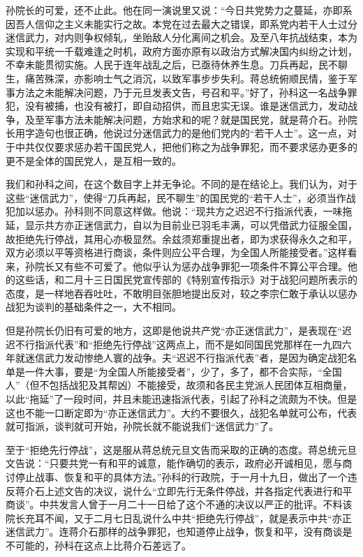 孙院长的可爱，还不止此。他在同一演说里又说：“今日共党势力之蔓延，亦即系因吾人信仰之主义未能实行之故。本党在过去最大之错误，即系党内若干人士过分迷信武力，对内则争权倾轧，坐贻敌人分化离间之机会。及至八年抗战结束，本为实现和平统一千载难逢之时机，政府方面亦原有以政治方式解决国内纠纷之计划，不幸未能贯彻实施。人民于连年战乱之后，已亟待休养生息。刀兵再起，民不聊生，痛苦殊深，亦影响士气之消沉，以致军事步步失利。蒋总统俯顺民情，鉴于军事方法之未能解决问题，乃于元旦发表文告，号召和平。”好了，孙科这一名战争罪犯，没有被捕，也没有被打，即自动招供，而且忠实无误。谁是迷信武力，发动战争，及至军事方法未能解决问题，方始求和的呢？就是国民党，就是蒋介石。孙院长用字造句也很正确，他说过分迷信武力的是他们党内的“若干人士”。这一点，对于中共仅仅要求惩办若干国民党人，把他们称之为战争罪犯，而不要求惩办更多的更不是全体的国民党人，是互相一致的。

我们和孙科之间，在这个数目字上并无争论。不同的是在结论上。我们认为，对于这些“迷信武力”，使得“刀兵再起，民不聊生”的国民党的“若干人士”，必须当作战犯加以惩办。孙科则不同意这样做。他说：“现共方之迟迟不行指派代表，一味拖延，显示共方亦正迷信武力，自以为目前业已羽毛丰满，可以凭借武力征服全国，故拒绝先行停战，其用心亦极显然。余兹须郑重提出者，即为求获得永久之和平，双方必须以平等资格进行商谈，条件则应公平合理，为全国人所能接受者。”这样看来，孙院长又有些不可爱了。他似乎认为惩办战争罪犯一项条件不算公平合理。他的这些话，和二月十三日国民党宣传部的《特别宣传指示》对于战犯问题所表示的态度，是一样地吞吞吐吐，不敢明目张胆地提出反对，较之李宗仁敢于承认以惩办战犯为谈判的基础条件之一，大不相同。

但是孙院长仍旧有可爱的地方，这即是他说共产党“亦正迷信武力”，是表现在“迟迟不行指派代表”和“拒绝先行停战”这两点上，而不是如同国民党那样在一九四六年就迷信武力发动惨绝人寰的战争。夫“迟迟不行指派代表”者，是因为确定战犯名单是一件大事，要是“为全国人所能接受者”，少了，多了，都不合实际，“全国人”（但不包括战犯及其帮凶）不能接受，故须和各民主党派人民团体互相商量，以此“拖延”了一段时间，并且未能迅速指派代表，引起了孙科之流颇为不快。但是这也不能一口断定即为“亦正迷信武力”。大约不要很久，战犯名单就可公布，代表就可指派，谈判就可开始，孙院长就不能说我们“迷信武力”了。

至于“拒绝先行停战”，这是服从蒋总统元旦文告而采取的正确的态度。蒋总统元旦文告说：“只要共党一有和平的诚意，能作确切的表示，政府必开诚相见，愿与商讨停止战事、恢复和平的具体方法。”孙科的行政院，于一月十九日，做出了一个违反蒋介石上述文告的决议，说什么“立即先行无条件停战，并各指定代表进行和平商谈”。中共发言人曾于一月二十一日给了这个不通的决议以严正的批评。不料该院长充耳不闻，又于二月七日乱说什么中共“拒绝先行停战”，就是表示中共“亦正迷信武力”。连蒋介石那样的战争罪犯，也知道停止战争，恢复和平，没有商谈是不可能的，孙科在这点上比蒋介石差远了。

